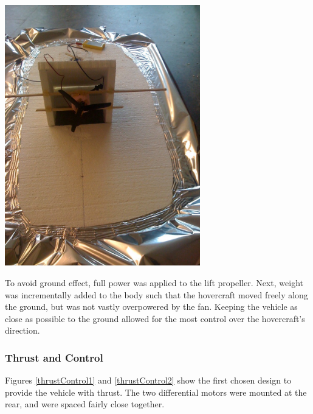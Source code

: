 \begin{minipage}{6.5in}
\begin{minipage}{6.5in}
\begin{minipage}{6.5in}
  \begin{center}
    \includegraphics[width=85mm]{imageSources/lift2.png}
  \end{center}
  \label{lift2}
\end{minipage}

To avoid ground effect, full power was applied to the lift propeller. Next, weight was incrementally added to the body such that the hovercraft moved freely along the ground, but was not vastly overpowered by the fan. Keeping the vehicle as close as possible to the ground allowed for the most control over the hovercraft's direction.

\subsubsection{Thrust and Control}

Figures \ref{thrustControl1} and \ref{thrustControl2} show the first chosen design to provide the vehicle with thrust. The two differential motors were mounted at the rear, and were spaced fairly close together.


\end{minipage}
\end{minipage}

